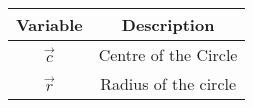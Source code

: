 \begin{center}
    \begin{tabular}{|c|c|} 
        \hline
            \textbf{Variable} & \textbf{Description} \\ 
        \hline
	    $\vec{c}$ & Centre of the Circle \\
        \hline
        $\vec{r}$ & Radius of the circle\\
        \hline
    \end{tabular}
\end{center}
